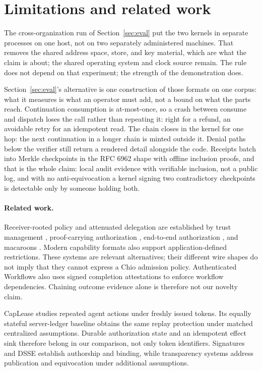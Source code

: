 \section{Limitations and related work}

The cross-organization run of Section~\ref{sec:eval} put the two kernels in
separate processes on one host, not on two separately administered machines.
That removes the shared address space, store, and key material, which are what
the claim is about; the shared operating system and clock source remain. The
rule does not depend on that experiment; the strength of the demonstration
does.

Section~\ref{sec:eval}'s alternative is one construction of those formats on one
corpus: what it measures is what an operator must add, not a bound on what the
parts reach.
Continuation consumption is at-most-once, so a crash between consume and
dispatch loses the call rather than repeating it: right for a refund, an
avoidable retry for an idempotent read. The chain closes in the kernel for one
hop: the next continuation in a longer chain is minted outside it.
Denial paths below the verifier still return a rendered detail alongside the
code. Receipts batch into
Merkle checkpoints in the RFC 6962 shape \cite{rfc6962} with offline inclusion
proofs, and that is the whole claim: local audit evidence with verifiable
inclusion, not a public log, and with no anti-equivocation a kernel signing two
contradictory checkpoints is detectable only by someone holding both.

\paragraph{Related work.}
Receiver-rooted policy and attenuated delegation are established by trust
management \cite{spki,keynote}, proof-carrying authorization \cite{bauer2002},
end-to-end authorization \cite{howell2000}, and macaroons \cite{macaroons}.
Modern capability formats \cite{ucan,biscuit} also support application-defined
restrictions. These systems are relevant alternatives; their different wire
shapes do not imply that they cannot express a Chio admission policy.
Authenticated Workflows \cite{authenticatedworkflows2026} also uses signed
completion attestations to enforce workflow dependencies. Chaining outcome
evidence alone is therefore not our novelty claim.

CapLease \cite{caplease2026} studies repeated agent actions under freshly issued
tokens. Its equally stateful server-ledger baseline obtains the same replay
protection under matched centralized assumptions. Durable authorization state
and an idempotent effect sink therefore belong in our comparison, not only
token identifiers. Signatures and DSSE \cite{dsse,intoto} establish authorship
and binding, while transparency systems \cite{rfc6962,scitt} address publication
and equivocation under additional assumptions.

